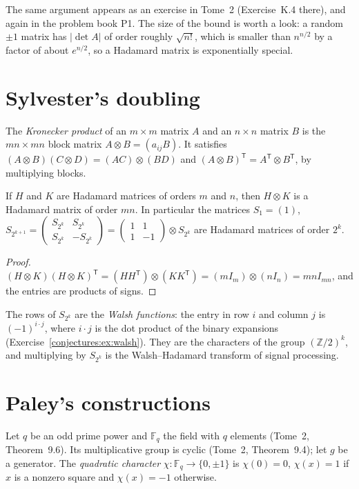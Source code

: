 The same argument appears as an exercise in Tome~2 (Exercise~K.4 there), and again in the problem book P1. The
size of the bound is worth a look: a random $\pm1$ matrix has $|\det A|$ of order roughly $\sqrt{n!}$, which is smaller than $n^{n/2}$ by a factor
of about $e^{n/2}$, so a Hadamard matrix is exponentially special.

\section{Sylvester's doubling}

The \emph{Kronecker product} of an $m\times m$ matrix $A$ and an $n\times n$ matrix $B$ is the $mn\times mn$ block matrix $A\otimes B=(a_{ij}B)$. It
satisfies $(A\otimes B)(C\otimes D)=(AC)\otimes(BD)$ and $(A\otimes B)^{\mathsf T}=A^{\mathsf T}\otimes B^{\mathsf T}$, by multiplying blocks.

\begin{proposition}[Sylvester, 1867]\label{conjectures:prop:kron}
If $H$ and $K$ are Hadamard matrices of orders $m$ and $n$, then $H\otimes K$ is a Hadamard matrix of order $mn$. In particular the matrices
$S_1=(1)$, $S_{2^{k+1}}=\begin{pmatrix}S_{2^k}&S_{2^k}\\S_{2^k}&-S_{2^k}\end{pmatrix}=\begin{pmatrix}1&1\\1&-1\end{pmatrix}\otimes S_{2^k}$ are
Hadamard matrices of order $2^k$.
\end{proposition}
\begin{proof}
$(H\otimes K)(H\otimes K)^{\mathsf T}=(HH^{\mathsf T})\otimes(KK^{\mathsf T})=(mI_m)\otimes(nI_n)=mnI_{mn}$, and the entries are products of signs.
\end{proof}

The rows of $S_{2^k}$ are the \emph{Walsh functions}: the entry in row $i$ and column $j$ is $(-1)^{i\cdot j}$, where $i\cdot j$ is the dot product of
the binary expansions (Exercise~\ref{conjectures:ex:walsh}). They are the characters of the group $(\mathbb Z/2)^k$, and multiplying by $S_{2^k}$ is the
Walsh--Hadamard transform of signal processing.

\section{Paley's constructions}

Let $q$ be an odd prime power and $\mathbb F_q$ the field with $q$ elements (Tome~2, Theorem~9.6). Its multiplicative group is cyclic (Tome~2,
Theorem~9.4); let $g$ be a generator. The \emph{quadratic character} $\chi:\mathbb F_q\to\{0,\pm1\}$ is $\chi(0)=0$, $\chi(x)=1$ if $x$ is a nonzero
square and $\chi(x)=-1$ otherwise.

